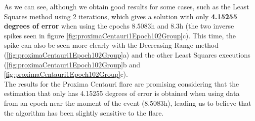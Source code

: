 As we can see, although we obtain good results for some cases, such as the Least Squares method using 2 iterations, which gives a solution with only \textbf{4.15255 degrees of error} when using the epochs 8.5083h and 8.3h (the two inverse spikes seen in figure \ref{fig:proximaCentauri1Epoch102Group}c). This time, the spike can also be seen more clearly with the Decreasing Range method (\ref{fig:proximaCentauri1Epoch102Group}a) and the other Least Squares executions (\ref{fig:proximaCentauri1Epoch102Group}b and \ref{fig:proximaCentauri1Epoch102Group}c). \\

The results for the Proxima Centauri flare are promising considering that the estimation that only has 4.15255 degrees of error is obtained when using data from an epoch near the moment of the event (8.5083h), leading us to believe that the algorithm has been slightly sensitive to the flare.


